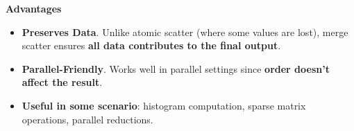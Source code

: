 \highspace
\begin{flushleft}
    \textcolor{Green3}{ \textbf{Advantages}}
\end{flushleft}
\begin{itemize}[label=\textcolor{Green3}{}]
    \item \textcolor{Green3}{\textbf{Preserves Data}}. Unlike atomic scatter (where some values are lost), merge scatter ensures \textbf{all data contributes to the final output}.
    \item \textcolor{Green3}{\textbf{Parallel-Friendly}}. Works well in parallel settings since \textbf{order doesn't affect the result}.
    \item \textcolor{Green3}{\textbf{Useful in some scenario}}: histogram computation, sparse matrix operations, parallel reductions.
\end{itemize}

